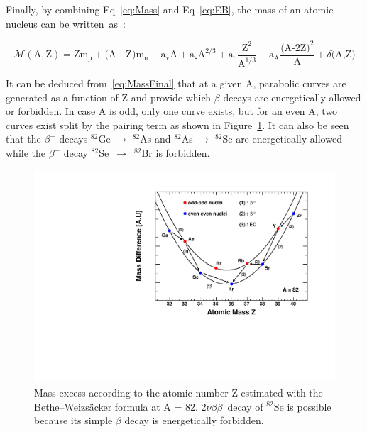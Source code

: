 \documentclass[main.tex]{subfiles}
\begin{document}
\bigskip


\NI Finally, by combining Eq~\ref{eq:Mass} and Eq~\ref{eq:EB}, the mass of an atomic nucleus can be written~as~:


\begin{equation}\label{eq:MassFinal}
\mathcal{M} (\text{A},\text{Z}) = \text{Z}\text{m}_\text{p} + \text{(A - Z)}\text{m}_{\text{n}} - \text{a}_\text{v} \text{A} + \text{a}_\text{s} \text{A}^{\text{2/3}} +  \text{a}_\text{c} \frac{\text{Z}^\text{2}}{\text{A}^{\text{1/3}}} +  \text{a}_\text{A} \frac{\text{(A-2Z)}^\text{2}}{\text{A}} + \delta \text{(A,Z)} 
\end{equation}


\NI It can be deduced from~\ref{eq:MassFinal} that at a given A, parabolic curves are generated as a function of Z and provide which $\beta$ decays are energetically allowed or forbidden. In case A is odd, only one curve exists, but for an even A, two curves exist split by the pairing term as shown in Figure~\ref{WeizsackerParabola}. It can also be seen that the $\beta^-$ decays $^{\text{82}}$Ge $\rightarrow$ $^{\text{82}}$As and $^{\text{82}}$As $\rightarrow$ $^{\text{82}}$Se are energetically allowed while the $\beta^-$ decay $^{\text{82}}$Se~$\rightarrow$~$^{\text{82}}$Br is forbidden.


\begin{figure}[h!]
\begin{center}
\includegraphics[scale=0.55]{pictures/Chap2/WeizsackerParabola_v3.pdf}
\caption{Mass excess according to the atomic number Z estimated with the Bethe–Weizsäcker formula at A = 82. 2$\nu\beta\beta$~decay of $^{\text{82}}$Se is possible because its simple $\beta$ decay is energetically forbidden.}
\label{WeizsackerParabola}
\end{center}
\end{figure}
\end{document}
